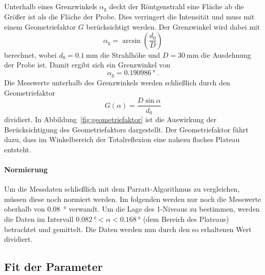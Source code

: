 Unterhalb eines Grenzwinkels $\alpha_\text{g}$ deckt der Röntgenstrahl eine
Fläche ab die Größer ist als die Fläche der Probe. Dies verringert die
Intensität und muss mit einem Geometriefaktor $G$ berücksichtigt werden.
Der Grenzwinkel wird dabei mit
\begin{equation}
  \alpha_\text{g} = \arcsin(\frac{d_0}{D})
\end{equation}
berechnet, wobei $d_0 = \SI{0.1}{\mm}$ die Strahlhöhe und
$D = \SI{30}{\mm}$ die Ausdehnung der Probe ist. Damit ergibt sich
ein Grenzwinkel von
\begin{equation}
  \alpha_\text{g} = \SI{0.190986}{\degree}~.
\end{equation}
Die Messwerte unterhalb des Grenzwinkels werden schließlich durch den
Geometriefaktor
\begin{equation}
  G(\alpha) = \frac{D \sin\alpha}{d_0}
\end{equation}
dividiert. In Abbildung~\ref{fig:geometriefaktor} ist die Auswirkung der
Berücksichtigung des Geometriefaktors dargestellt.
Der Geometriefaktor führt dazu, dass im Winkelbereich der Totalreflexion
eine nahezu flaches Plateau entsteht.


\paragraph{Normierung}
\label{par:normierung}

Um die Messdaten schließlich mit dem Parratt-Algorithmus zu vergleichen, müssen
diese noch normiert werden.
Im folgenden werden nur noch die Messwerte oberhalb von \SI{0.08}{\degree}
verwandt. Um die Lage des 1-Niveaus zu bestimmen, werden die Daten im
Intervall $\SI{0.082}{\degree} < \alpha < \SI{0.168}{\degree}$
(dem Bereich des Plateaus) betrachtet und
gemittelt. Die Daten werden nun durch den so erhaltenen Wert dividiert.

\subsection{Fit der Parameter}
\label{sub:fit_der_parameter}


